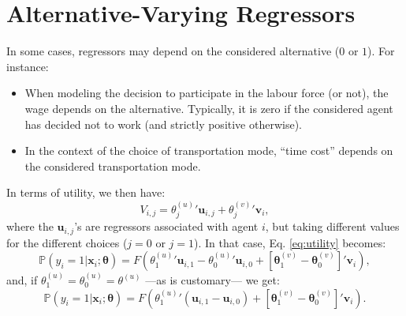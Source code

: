 \documentclass[
  12pt,
]{book}
\providecommand{\tightlist}{%
  \setlength{\itemsep}{0pt}\setlength{\parskip}{0pt}}
\theoremstyle{definition}
\theoremstyle{definition}
\theoremstyle{definition}
\theoremstyle{definition}
\theoremstyle{remark}
\begin{document}
\hypertarget{Avregressors}{%
\section{Alternative-Varying Regressors}\label{Avregressors}}

In some cases, regressors may depend on the considered alternative (\(0\) or \(1\)). For instance:

\begin{itemize}
\tightlist
\item
  When modeling the decision to participate in the labour force (or not), the wage depends on the alternative. Typically, it is zero if the considered agent has decided not to work (and strictly positive otherwise).
\item
  In the context of the choice of transportation mode, ``time cost'' depends on the considered transportation mode.
\end{itemize}

In terms of utility, we then have:
\[
V_{i,j} = {\theta^{(u)}_{j}}'\mathbf{u}_{i,j} + {\theta^{(v)}_{j}}'\mathbf{v}_{i},
\]
where the \(\mathbf{u}_{i,j}\)'s are regressors associated with agent \(i\), but taking different values for the different choices (\(j=0\) or \(j=1\)). In that case, Eq. \eqref{eq:utility} becomes:
\begin{equation}
\mathbb{P}(y_i = 1|\mathbf{x}_i;\boldsymbol\theta)  = F\left({\theta^{(u)}_{1}}'\mathbf{u}_{i,1}-{\theta^{(u)}_{0}}'\mathbf{u}_{i,0}+[\boldsymbol\theta_1^{(v)}-\boldsymbol\theta_0^{(v)}]'\mathbf{v}_i\right),\label{eq:utility2}
\end{equation}
and, if \(\theta^{(u)}_{1}=\theta^{(u)}_{0}=\theta^{(u)}\) ---as is customary--- we get:
\begin{equation}
\mathbb{P}(y_i = 1|\mathbf{x}_i;\boldsymbol\theta)  = F\left({\theta^{(u)}_{1}}'(\mathbf{u}_{i,1}-\mathbf{u}_{i,0})+[\boldsymbol\theta_1^{(v)}-\boldsymbol\theta_0^{(v)}]'\mathbf{v}_i\right).\label{eq:utility3}
\end{equation}
\end{document}
